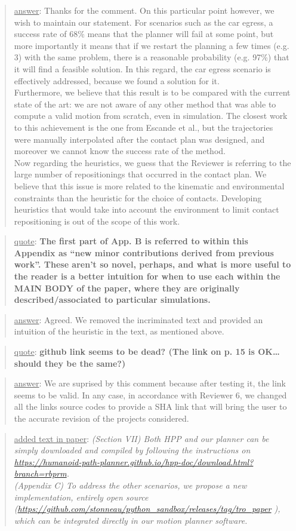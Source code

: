\documentclass[a4paper]{article}
\newcommand{\done}[0]{}
\newcommand\quot[1]{\begin{quote} \underline{quote}: \textbf{#1}\end{quote}}
\newcommand\as[1]{\begin{quote} \underline{answer}: {#1}\end{quote} }
\newcommand\qt[1]{\begin{quote} \underline{added text in paper}: \textit{#1}\end{quote} \leavevmode \\ }
\begin{document}
\as{Thanks for the comment. On this particular point however, we wish to maintain our statement. For scenarios such as the car egress, a success rate of $68 \%$ means that the planner
will fail at some point, but more importantly it means that if we restart the planning a few times (e.g. 3) with the same problem, there is a reasonable probability (e.g. 97\%) that it will find a feasible solution.
In this regard, the car egress scenario is effectively addressed, because we found a solution for it. \\
Furthermore, we believe that this result is to be compared with the current state of the art: we are not aware of any other method that was able
to compute a valid motion from scratch, even in simulation. The closest work to this achievement is the one from Escande et al., but the trajectories were manually interpolated
after the contact plan was designed, and moreover we cannot know the success rate of the method. \\
Now regarding the heuristics, we guess that the Reviewer is referring to the large number of repositionings that occurred in the contact plan. We believe that this issue
is more related to the kinematic and environmental constraints than the heuristic for the choice of contacts. Developing heuristics that would take into account the environment to limit 
contact repositioning is out of the scope of this work.}

\done

\quot{
The first part of App. B is referred to within this Appendix as “new minor contributions derived from previous work”. These aren’t so novel, perhaps, and what is more useful to the reader is a better intuition for when to use each within the MAIN BODY of the paper, where they are originally described/associated to particular simulations.
}

\as{Agreed. We removed the incriminated text and provided an intuition of the heuristic in the text, as mentioned above.}\done

\quot{github link seems to be dead? (The link on p. 15 is OK\dots should they be the same?)}

\as{We are suprised by this comment because after testing it, the link seems to be valid. In any case, in accordance with Reviewer 6, we changed all the links source codes to provide a SHA link that will bring the user to the accurate revision of the projects considered.}
\qt{(Section VII) Both HPP and our planner can be simply downloaded and compiled by following the instructions on
\url{https://humanoid-path-planner.github.io/hpp-doc/download.html?branch=rbprm}. \\
(Appendix C) To address the other scenarios, we propose a new implementation, entirely open source (\url{https://github.com/stonneau/python_sandbox/releases/tag/tro_paper} ), which can be integrated directly in our motion planner software. }\done
\end{document}
